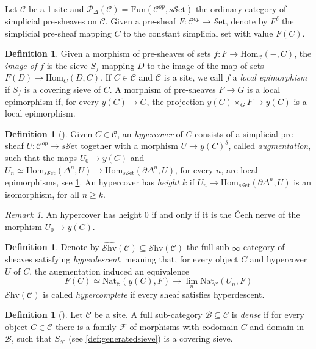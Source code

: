 \documentclass[10pt]{amsart}
\newcommand{\B}{\mathscr{B}}
\newcommand{\C}{\mathscr{C}}
\newcommand{\F}{\mathscr{F}}
\newcommand{\rP}{\mathscr{P}}
\newcommand{\Hom}{\mathrm{Hom}}
\newcommand{\set}{\mathscr{S}\mathrm{et}}
\newcommand{\sset}{s\mathscr{S}\mathrm{et}}
\newcommand{\Fun}{\mathrm{Fun}}
\newcommand{\Nat}{\mathrm{Nat}}
\newcommand{\Shv}{\mathscr{S}\mathrm{hv}}
\theoremstyle{definition}
\newtheorem{definition}[equation]{Definition}
\theoremstyle{remark}
\newtheorem{remark}[equation]{Remark}
\numberwithin{equation}{section}
\begin{document}
Let $\C$ be a 1-site and $\rP_\Delta(\C)=\Fun(\C^{op},\sset)$ the ordinary category of simplicial pre-sheaves on $\C$. Given a pre-sheaf $F:\C^{op}\to\set$, denote by $F^\delta$ the simplicial pre-sheaf mapping $C$ to the constant simplicial set with value $F(C)$. 
\begin{definition}\label{def:locepi}
	Given a morphism of pre-sheaves of sets $f:F\to\Hom_\C(-,C)$, the \emph{image of $f$} is the sieve $S_f$  mapping $D$ to the image of the map of sets $F(D)\to\Hom_C(D,C)$. If $C\in\C$ and $\C$ is a site, we call $f$ a \emph{local epimorphism} if $S_f$ is a covering sieve of $C$. A morphism of pre-sheaves $F\to G$ is a local epimorphism if, for every $y(C)\to G$, the projection $y(C)\times_GF\to y(C)$ is a local epimorphism. 
\end{definition}
\begin{definition}[{\cite[Lemma 4.9]{dugger2003hypercoverssimplicialpresheaves}}]
	Given $C\in\C$, an \emph{hypercover} of $C$ consists of a simplicial pre-sheaf $U:\C^{op}\to\sset$ together with a morphism $U\to y(C)^\delta$, called \emph{augmentation}, such that the maps $U_0\to y(C)$ and $U_n\simeq \Hom_{\sset}({\Delta^n},U)\to\Hom_{\sset}({\partial\Delta^n},U)$, for every $n$, are local epimorphisms, see \cref{def:locepi}. An hypercover has \emph{height $k$} if $U_n\to\Hom_{\sset}(\partial\Delta^n,U)$ is an isomorphism, for all $n\geq k$. 
\end{definition}
\begin{remark}\label{rmk:cech}
	An hypercover has height 0 if and only if it is the \v Cech nerve of the morphism $U_0\to y(C)$. 
\end{remark}
\begin{definition}
	Denote by $\widehat{\Shv}(\C)\subseteq\Shv(\C)$ the full sub-$\infty$-category of sheaves satisfying \emph{hyperdescent}, meaning that, for every object $C$ and hypercover $U$ of $C$, the augmentation induced an equivalence 
	$$F(C)\simeq\Nat_\C(y(C),F)\to\lim_n\Nat_\C(U_n,F)$$ $\Shv(\C)$ is called \emph{hypercomplete} if every sheaf satisfies hyperdescent. 
\end{definition}
\begin{definition}[{\cite[Definition 3.12.2]{barwick2020exodromy}}]\label{def:dense}
	Let $\C$ be a site. A full sub-category $\B\subseteq\C$ is \emph{dense} if for every object $C\in\C$ there is a family $\F$ of morphisms with codomain $C$ and domain in $\B$, such that $S_\F$ (see \cref{def:generatedsieve}) is a covering sieve. 
\end{definition}
\end{document}
